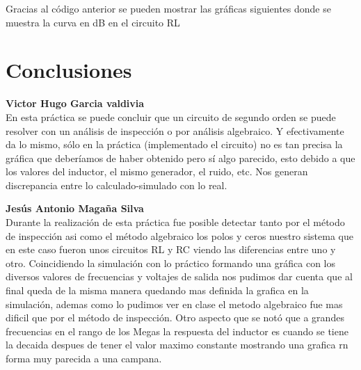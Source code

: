 \documentclass[letterpaper,10pt]{article}
\begin{document}
\vspace*{0.3in}
\textbf{}
Gracias al código anterior se pueden mostrar las gráficas siguientes donde se muestra la curva en dB en el circuito RL\\




\newpage

\section{Conclusiones}
\vspace*{0.3in}
\textbf{Victor Hugo Garcia valdivia\\}
En esta práctica se puede concluir que un circuito de segundo orden se puede resolver con un análisis de inspección o por análisis algebraico. Y efectivamente da lo mismo, sólo en la práctica (implementado el circuito) no es tan precisa la gráfica que deberíamos de haber obtenido pero sí algo parecido, esto debido a que los valores del inductor, el mismo generador, el ruido, etc. Nos generan discrepancia entre lo calculado-simulado con lo real. \\

	 
\vspace*{0.3in}
	  
\textbf{Jesús Antonio Magaña Silva} \\

Durante la realización de esta práctica fue posible detectar tanto por 
el método de inspección asi como el método algebraico los polos y ceros
nuestro sistema que en este caso fueron unos circuitos RL y RC viendo
las diferencias entre uno y otro.
Coincidiendo la simulación con lo práctico formando una gráfica con los 
diversos valores de frecuencias y voltajes de salida nos pudimos dar 
cuenta que al final queda de la misma manera quedando mas definida la 
grafica en la simulación, ademas como lo  pudimos ver en clase el metodo 
algebraico fue mas dificil que por el método de inspección.
Otro aspecto que se notó que a grandes frecuencias en el rango de los
Megas la respuesta del inductor es cuando se tiene la decaida despues de 
tener el valor maximo constante mostrando una grafica rn forma muy parecida
a una campana.\\
\end{document}
